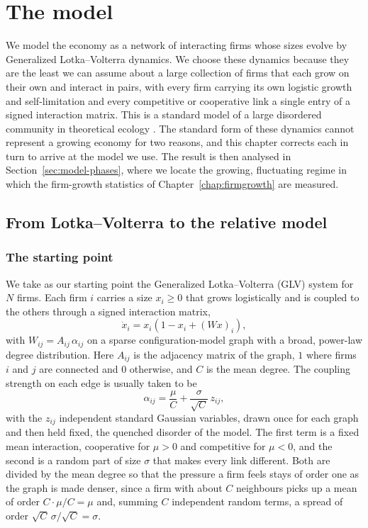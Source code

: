 \chapter{The model}
\label{chap:growing}

We model the economy as a network of interacting firms whose sizes evolve by Generalized
Lotka--Volterra dynamics. We choose these dynamics because they are the least we can assume about
a large collection of firms that each grow on their own and interact in pairs, with every firm
carrying its own logistic growth and self-limitation and every competitive or cooperative link a
single entry of a signed interaction matrix. This is a standard model of a large disordered
community in theoretical ecology \citep{bunin2017}. The standard form of these dynamics cannot represent
a growing economy for two reasons, and this chapter corrects each in turn to arrive at the model
we use. The result is then analysed in
Section~\ref{sec:model-phases}, where we locate the growing, fluctuating regime in which the
firm-growth statistics of Chapter~\ref{chap:firmgrowth} are measured.

\section{From Lotka--Volterra to the relative model}
\label{sec:relative-model}

\subsection{The starting point}
\label{sec:starting-point}

We take as our starting point the Generalized Lotka--Volterra (GLV) system for $N$ firms. Each
firm $i$ carries a size $x_i \ge 0$ that grows logistically and is coupled to the others through a signed
interaction matrix,
\begin{equation}
    \dot{x}_i = x_i \left( 1 - x_i + (Wx)_i \right),
    \label{eq:abs-glv}
\end{equation}
with $W_{ij} = A_{ij}\,\alpha_{ij}$ on a sparse configuration-model graph with a broad, power-law
degree distribution. Here $A_{ij}$ is the
adjacency matrix of the graph, $1$ where firms $i$ and $j$ are connected and $0$ otherwise, and
$C$ is the mean degree. The coupling strength on each edge is usually taken to be
\begin{equation}
    \alpha_{ij} = \frac{\mu}{C} + \frac{\sigma}{\sqrt{C}}\,z_{ij},
    \label{eq:coupling-global}
\end{equation}
with the $z_{ij}$ independent standard Gaussian variables, drawn once for each graph and then held
fixed, the quenched disorder of the model. The first term is a fixed mean interaction, cooperative
for $\mu > 0$ and competitive for $\mu < 0$, and the second is a random part of size $\sigma$ that
makes every link different. Both are divided by the mean degree so that the pressure a firm feels
stays of order one as the graph is made denser, since a firm with about $C$ neighbours picks up a
mean of order $C \cdot \mu/C = \mu$ and, summing $C$ independent random terms, a spread of order
$\sqrt{C}\,\sigma/\sqrt{C} = \sigma$.

